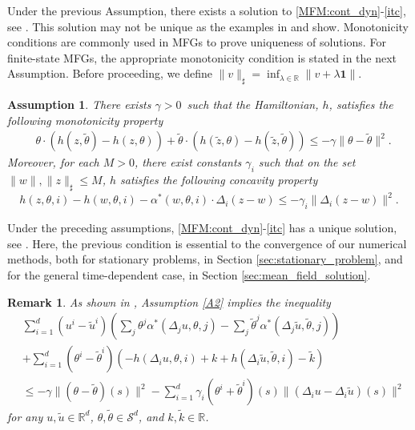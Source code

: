 \documentclass[12pt]{amsart}
\newcommand{\Rr}{{\mathbb{R}}}
\newcommand{\1}{{\chi}}
\newcommand{\lb}{\left(}
\newcommand{\rb}{\right)}
\newcommand{\Ss}{\mathcal{S}}
\newcommand{\re}{\mathbb{R}}
\newtheorem{hyp}{Assumption}
\newtheorem{rem}{Remark}
\theoremstyle{definition}
\begin{document}
Under the previous Assumption, there exists a solution to \eqref{MFM:cont_dyn}-\eqref{itc}, see \cite{GMS2}. This solution may not be unique as the examples in \cite{GVW-dual} and \cite{Gomes:2014kq} show.
Monotonicity conditions are commonly used in MFGs  to prove
uniqueness of solutions. 
For finite-state MFGs, the appropriate monotonicity condition is stated in the next Assumption. Before proceeding, we define $\|v \|_{\sharp}=\inf_{\lambda\in \re}\|v +\lambda\mathbf{1} \|$.
\begin{hyp}
        \label{A2}
        There exists $\gamma>0$\ such that the Hamiltonian, $h$, satisfies the following monotonicity property
        \begin{align*}
                &\theta \cdot (h(z,\tilde \theta)-h(z,\theta))+ \tilde \theta\cdot(h(\tilde z,\theta)-h(\tilde z,\tilde \theta)   )\leq -\gamma \|\theta -\tilde \theta  \|^2.
        \end{align*}
        Moreover, for each $M>0$, there exist constants $\gamma_i$ such that on the set  
        $\|w\|,\|z\|_\sharp\leq M$, $h$ satisfies the following concavity property
        \begin{equation*}
                h(z,\theta,i)-h( w,\theta,i)-\alpha^*(w,\theta,i)\cdot\Delta_i(z-w)\leq -\gamma_i\|\Delta_i (z-w)\|^2.
        \end{equation*}         
\end{hyp}               
Under the preceding assumptions,             
\eqref{MFM:cont_dyn}-\eqref{itc} has a unique solution, see \cite{GMS2}.
Here, the previous condition is essential to the convergence of our numerical methods, both for stationary problems, in Section \ref{sec:stationary_problem}, 
and for the general time-dependent case, in Section \ref{sec:mean_field_solution}. 
\begin{rem}
\label{R1}      
As shown in \cite{GMS2}, 
        Assumption \eqref{A2} implies the
        inequality
        \begin{align*}
                &\sum_{i=1}^d (u^i-\tilde u^i) \lb \sum_j \theta^j \alpha^*(\Delta_j u,\theta,j) - \sum_j \tilde \theta^j \alpha^*(\Delta_j \tilde u, \tilde \theta,j) \rb \\
                &+ \sum_{i=1}^d  (\theta^i-\tilde \theta^i) \lb - h(\Delta_i u, \theta,i) + k +h(\Delta_i \tilde u, \tilde \theta,i) -\tilde k\rb\\
                &\leq -\gamma \|(\theta- \tilde \theta)(s)\|^2 - \sum_{i=1}^d \gamma_i(\theta^i+\tilde \theta^i)(s) \|(\Delta_i u- \Delta_i \tilde u)(s)\| ^2 
        \end{align*}
        for any $u, \tilde u\in \Rr^d$,  $\theta, \tilde \theta\in \Ss^d$, and $k, \tilde k\in \Rr$. 
\end{rem}
\end{document}
